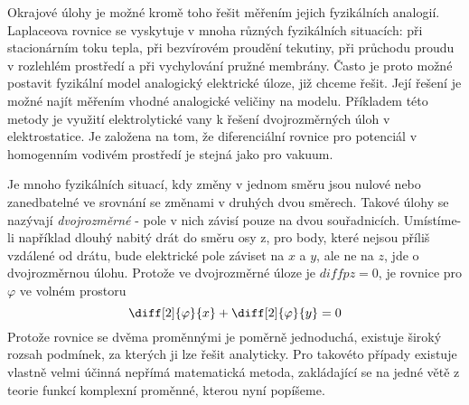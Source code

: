   Okrajové úlohy je možné kromě toho řešit měřením jejich fyzikálních analogií. Laplaceova rovnice
  se vyskytuje v mnoha různých fyzikálních situacích: při stacionárním toku tepla, při bezvírovém
  proudění tekutiny, při průchodu proudu v rozlehlém prostředí a při vychylování pružné membrány.
  Často je proto možné postavit fyzikální model analogický elektrické úloze, již chceme řešit. Její
  řešení je možné najít měřením vhodné analogické veličiny na modelu. Příkladem této metody je
  využití elektrolytické vany k řešení dvojrozměrných úloh v elektrostatice. Je založena na tom, že
  diferenciální rovnice pro potenciál v homogenním vodivém prostředí je stejná jako pro vakuum.

  Je mnoho fyzikálních situací, kdy změny v jednom směru jsou nulové nebo zanedbatelné ve srovnání
  se změnami v druhých dvou směrech. Takové úlohy se nazývají \emph{dvojrozměrné} - pole v nich
  závisí pouze na dvou souřadnicích. Umístíme-li například dlouhý nabitý drát do směru osy z, pro
  body, které nejsou příliš vzdálené od drátu, bude elektrické pole záviset na \(x\) a \(y\), ale ne
  na \(z\), jde o dvojrozměrnou úlohu. Protože ve dvojrozměrné úloze je \(diffp{}{z}=0\), je rovnice
  pro \(\varphi\) ve volném prostoru
  \begin{equation}\label{fyz:eq828}
    \diff[2]{\varphi}{x} + \diff[2]{\varphi}{y} = 0
  \end{equation}
  Protože rovnice se dvěma proměnnými je poměrně jednoduchá, existuje široký rozsah podmínek, za
  kterých ji lze řešit analyticky. Pro takovéto případy existuje vlastně velmi účinná nepřímá
  matematická metoda, zakládající se na jedné větě z teorie funkcí komplexní proměnné, kterou nyní
  popíšeme.


